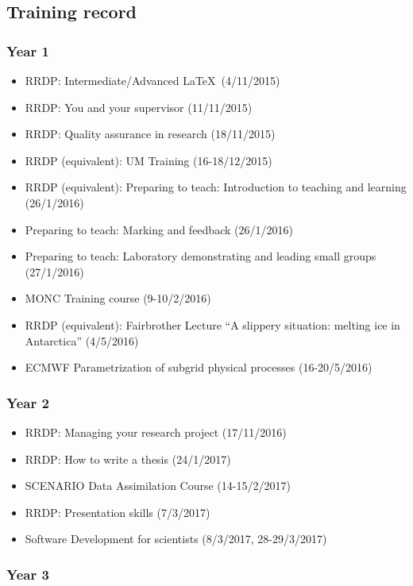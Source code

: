 \documentclass[11pt,a4paper]{article}
\begin{document}
\subsection*{Training record}
\subsubsection*{Year 1}

\begin{itemize}
  \item RRDP: Intermediate/Advanced \LaTeX\ (4/11/2015)
  \item RRDP: You and your supervisor (11/11/2015)
  \item RRDP: Quality assurance in research (18/11/2015)
  \item RRDP (equivalent): UM Training (16-18/12/2015)
  \item RRDP (equivalent): Preparing to teach: Introduction to teaching and learning (26/1/2016)
  \item Preparing to teach: Marking and feedback (26/1/2016)
  \item Preparing to teach: Laboratory demonstrating and leading small groups (27/1/2016)
  \item MONC Training course (9-10/2/2016)
  \item RRDP (equivalent): Fairbrother Lecture ``A slippery situation: melting ice in Antarctica'' (4/5/2016)
  \item ECMWF Parametrization of subgrid physical processes (16-20/5/2016)
\end{itemize}

\subsubsection*{Year 2}

\begin{itemize}
  \item RRDP: Managing your research project (17/11/2016)
  \item RRDP: How to write a thesis (24/1/2017)
  \item SCENARIO Data Assimilation Course (14-15/2/2017)
  \item RRDP: Presentation skills (7/3/2017)
  \item Software Development for scientists (8/3/2017, 28-29/3/2017)
\end{itemize}

\subsubsection*{Year 3}
\end{document}
